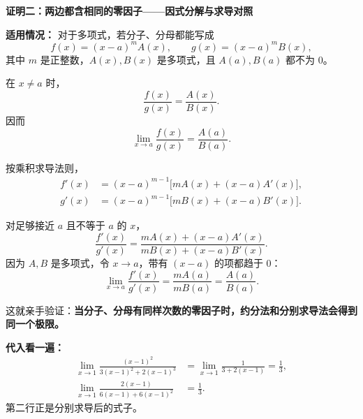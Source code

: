 \begin{proofbox}
\textbf{\textcolor{CProof}{证明二：两边都含相同的零因子——因式分解与求导对照}}
\begin{center}\end{center}


\textbf{适用情况：} 对于多项式，若分子、分母都能写成
\[
 f(x)=(x-a)^m A(x),\qquad g(x)=(x-a)^m B(x),
\]
其中 $m$ 是正整数，$A(x),B(x)$ 是多项式，且 $A(a),B(a)$ 都不为 $0$。

\begin{description}[style=nextline, leftmargin=2.6em, labelsep=0.4em, itemsep=0.55em]
    \item[\textbf{第1步：先按初中代数约分。}]
    在 $x\ne a$ 时，
    \[
       \frac{f(x)}{g(x)}=\frac{A(x)}{B(x)}.
    \]
    因而
    \[
       \lim_{x\to a}\frac{f(x)}{g(x)}=\frac{A(a)}{B(a)}.
    \]

    \item[\textbf{第2步：分别求导。}]
    按乘积求导法则，
    \[
    \begin{aligned}
    f'(x)&=(x-a)^{m-1}\bigl[mA(x)+(x-a)A'(x)\bigr],\\
    g'(x)&=(x-a)^{m-1}\bigl[mB(x)+(x-a)B'(x)\bigr].
    \end{aligned}
    \]

    \item[\textbf{第3步：同样约去公共部分。}]
    对足够接近 $a$ 且不等于 $a$ 的 $x$，
    \[
      \frac{f'(x)}{g'(x)}
      =\frac{mA(x)+(x-a)A'(x)}{mB(x)+(x-a)B'(x)}.
    \]
    因为 $A,B$ 是多项式，令 $x\to a$，带有 $(x-a)$ 的项都趋于 $0$：
    \[
    \lim_{x\to a}\frac{f'(x)}{g'(x)}
      =\frac{mA(a)}{mB(a)}=\frac{A(a)}{B(a)}.
    \]
\end{description}

这就亲手验证：\textbf{当分子、分母有同样次数的零因子时，约分法和分别求导法会得到同一个极限。}

\textbf{代入看一遍：}
\[
\begin{aligned}
\lim_{x\to1}\frac{(x-1)^2}{3(x-1)^2+2(x-1)^3}
&=\lim_{x\to1}\frac{1}{3+2(x-1)}=\frac13,\\
\lim_{x\to1}\frac{2(x-1)}{6(x-1)+6(x-1)^2}
&=\frac13.
\end{aligned}
\]
第二行正是分别求导后的式子。

\medskip
\end{proofbox}
\clearpage
